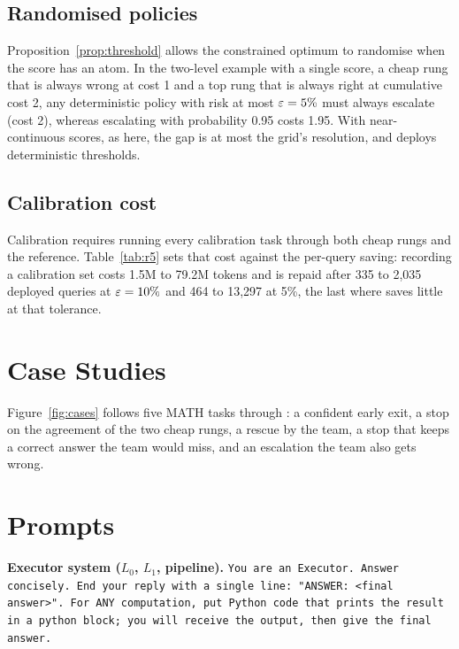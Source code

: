 \subsection{Randomised policies}
\label{app:randomised}
Proposition~\ref{prop:threshold} allows the constrained optimum to randomise when the score has an atom. In
the two-level example with a single score, a cheap rung that is always wrong at cost 1 and a top rung that is
always right at cumulative cost 2, any deterministic policy with risk at most $\varepsilon = 5\%$ must always
escalate (cost 2), whereas escalating with probability 0.95 costs 1.95. With near-continuous scores, as here, the
gap is at most the grid's resolution, and \climb{} deploys deterministic thresholds.

\subsection{Calibration cost}
\label{app:calibcost}
Calibration requires running every calibration task through both cheap rungs and the reference.
Table~\ref{tab:r5} sets that cost against the per-query saving: recording a calibration set costs 1.5M to
79.2M tokens and is repaid after 335 to 2{,}035 deployed queries at $\varepsilon = 10\%$ and 464 to 13{,}297 at 5\%,
the last where \climb{} saves little at that tolerance.



\section{Case Studies}
\label{app:cases}




Figure~\ref{fig:cases} follows five MATH tasks through \climb{}: a confident early exit, a stop on the
agreement of the two cheap rungs, a rescue by the team, a stop that keeps a correct answer the team would
miss, and an escalation the team also gets wrong.

\section{Prompts}
\label{app:prompts}

\small\raggedright
\noindent\textbf{Executor system ($L_0$, $L_1$, pipeline).} \texttt{You are an Executor. Answer concisely.
End your reply with a single line: "ANSWER: <final answer>". For ANY computation, put Python code
that prints the result in a \textasciigrave\textasciigrave\textasciigrave python block; you will receive the
output, then give the final answer.}

